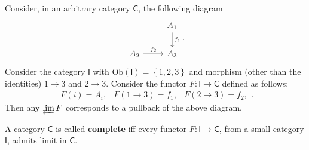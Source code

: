 \begin{ex}
	Consider, in an arbitrary category $\mathsf{C}$, the following diagram
	\begin{equation}
	\begin{tikzcd}
		& A_1 \arrow[d, "f_1", rightarrow] \\
		A_2 \arrow[r, "f_2", rightarrow] &
		A_3
	\end{tikzcd}
	.\end{equation} 
	Consider the category $\mathsf{I}$ with $\mathrm{Ob} \left(\mathsf{I}\right) = \left\{ 1, 2, 3 \right\}$ and morphism (other than the identities) $1 \to 3$ and $2 \to 3$.
	Consider the functor $F: \mathsf{I} \to \mathsf{C}$ defined as follows:
	 \begin{equation}
		 \begin{matrix}
			 F(i) = A_i, &
			 F( 1 \to 3) = f_1, &
			 F( 2 \to 3) = f_2,
		 \end{matrix} 
	.\end{equation} 
	Then any $\varprojlim F$ corresponds to a pullback of the above diagram.
\end{ex} 

\begin{defn}
	A category $\mathsf{C}$ is called \textbf{complete} iff 
	every functor $F: \mathsf{I} \to \mathsf{C}$, from a small category $\mathsf{I}$, admits limit in $\mathsf{C}$.
\end{defn}

